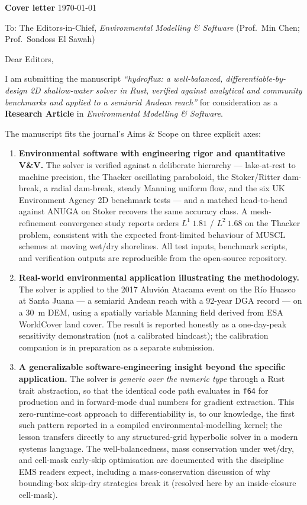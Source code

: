\documentclass[11pt]{article}
\begin{document}
\noindent
\textbf{Cover letter} \hfill \today

\medskip
\noindent To: The Editors-in-Chief, \emph{Environmental Modelling \&
Software} (Prof.\ Min Chen; Prof.\ Sondoss El Sawah)

\medskip
Dear Editors,

I am submitting the manuscript \emph{``hydroflux: a well-balanced,
differentiable-by-design 2D shallow-water solver in Rust, verified
against analytical and community benchmarks and applied to a semiarid
Andean reach''} for consideration as a \textbf{Research Article} in
\emph{Environmental Modelling \& Software}.

The manuscript fits the journal's Aims \& Scope on three explicit axes:

\begin{enumerate}[leftmargin=*, label=\arabic*.]
\item \textbf{Environmental software with engineering rigor and
quantitative V\&V.} The solver is verified against a deliberate
hierarchy --- lake-at-rest to machine precision, the Thacker
oscillating paraboloid, the Stoker/Ritter dam-break, a radial
dam-break, steady Manning uniform flow, and the six UK Environment
Agency 2D benchmark tests --- and a matched head-to-head against
ANUGA on Stoker recovers the same accuracy class. A mesh-refinement
convergence study reports orders $L^1\ 1.81$ / $L^2\ 1.68$ on the
Thacker problem, consistent with the expected front-limited behaviour
of MUSCL schemes at moving wet/dry shorelines. All test inputs,
benchmark scripts, and verification outputs are reproducible from the
open-source repository.

\item \textbf{Real-world environmental application illustrating the
methodology.} The solver is applied to the 2017 Aluvión Atacama event
on the Río Huasco at Santa Juana --- a semiarid Andean reach with a
92-year DGA record --- on a 30~m DEM, using a spatially variable
Manning field derived from ESA WorldCover land cover. The result is
reported honestly as a one-day-peak sensitivity demonstration (not a
calibrated hindcast); the calibration companion is in preparation as
a separate submission.

\item \textbf{A generalizable software-engineering insight beyond the
specific application.} The solver is \emph{generic over the numeric
type} through a Rust trait abstraction, so that the identical code
path evaluates in \texttt{f64} for production and in forward-mode
dual numbers for gradient extraction. This zero-runtime-cost approach
to differentiability is, to our knowledge, the first such pattern
reported in a compiled environmental-modelling kernel; the lesson
transfers directly to any structured-grid hyperbolic solver in a
modern systems language. The well-balancedness, mass conservation
under wet/dry, and cell-mask early-skip optimisation are documented
with the discipline EMS readers expect, including a mass-conservation
discussion of why bounding-box skip-dry strategies break it (resolved
here by an inside-closure cell-mask).
\end{enumerate}
\end{document}
